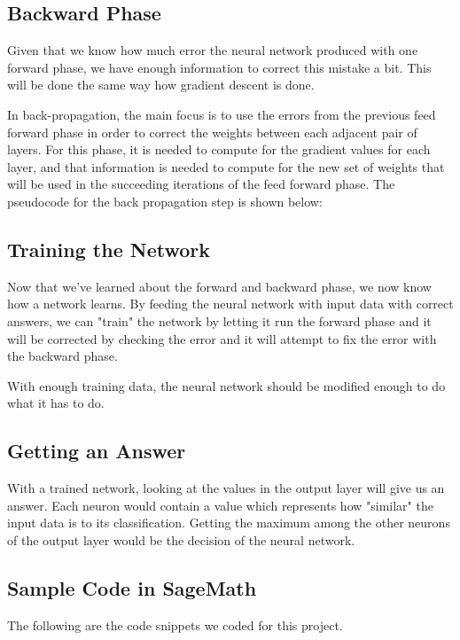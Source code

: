 \documentclass[a4paper, 11pt, english]{article}
\begin{document}
\subsection{Backward Phase}
\par Given that we know how much error the neural network produced with one forward phase, we have enough information to correct this mistake a bit. This will be done the same way how gradient descent is done.
\par In back-propagation, the main focus is to use the errors from the previous feed forward phase in order to correct the weights between each adjacent pair of layers. For this phase, it is needed to compute for the gradient values for each layer, and that information is needed to compute for the new set of weights that will be used in the succeeding iterations of the feed forward phase. The pseudocode for the back propagation step is shown below:


\subsection{Training the Network}
\par Now that we've learned about the forward and backward phase, we now know how a network learns. By feeding the neural network with input data with correct answers, we can "train" the network by letting it run the forward phase and it will be corrected by checking the error and it will attempt to fix the error with the backward phase.
\par With enough training data, the neural network should be modified enough to do what it has to do.

\subsection{Getting an Answer}
\par With a trained network, looking at the values in the output layer will give us an answer. Each neuron would contain a value which represents how "similar" the input data is to its classification. Getting the maximum among the other neurons of the output layer would be the decision of the neural network.

\subsection{Sample Code in SageMath}
\par The following are the code snippets we coded for this project.
\end{document}
